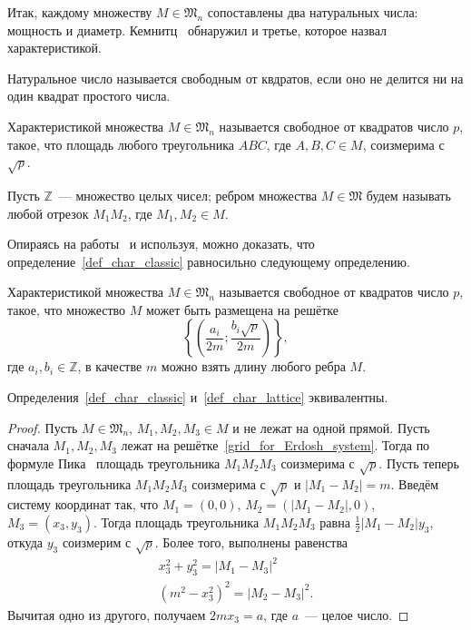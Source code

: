 Итак, каждому множеству $M\in\mathfrak{M}_n$ сопоставлены
два натуральных числа: мощность и диаметр.
Кемнитц~\cite{kemnitz1988punktmengen} обнаружил и третье,
которое назвал характеристикой.

\begin{definition}
	\cite[гл. 34, п. 3]{Bukhstab-number-theory}
	Натуральное число называется свободным от квдратов,
	если оно не делится ни на один квадрат простого числа.
\end{definition}

\begin{definition}
	\label{def_char_classic}
	Характеристикой множества $M\in\mathfrak{M}_n$ называется свободное от квадратов
	число $p$, такое, что площадь любого треугольника $ABC$, где $A,B,C\in M$,
	соизмерима с $\sqrt{p}$.
\end{definition}

Пусть $\mathbb{Z}$~--- множество целых чисел;
ребром множества $M\in\mathfrak{M}$
будем называть любой отрезок $M_1 M_2$,
где $M_1, M_2 \in M$.

Опираясь на работы~\cite{our-mkmitu-2016,our-ped-2017} и используя,
можно доказать, что определение~\ref{def_char_classic} равносильно следующему определению.
\begin{definition}
	\label{def_char_lattice}
	Характеристикой множества $M\in\mathfrak{M}_n$ называется свободное от квадратов
	число $p$, такое, что множество $M$ может быть размещена на решётке
\begin{equation}\label{grid_for_Erdosh_system}
	\left\{\left(
		\frac{a_i}{2m}
		;
		\frac{b_i\sqrt{p}}{2m}
	\right)\right\},
\end{equation}
где $a_i, b_i \in \mathbb{Z}$,
в качестве $m$ можно взять длину любого ребра $M$.
\end{definition}

\begin{theorem}
	Определения~\ref{def_char_classic} и~\ref{def_char_lattice} эквивалентны.
\end{theorem}
\begin{proof}
	Пусть $M\in\mathfrak{M}_n$, $M_1,M_2,M_3 \in M$ и не лежат на одной прямой.
	Пусть сначала $M_1,M_2,M_3$ лежат на решётке~\eqref{grid_for_Erdosh_system}.
	Тогда по формуле Пика~\cite[теорема 3.1]{polygons-on-lattices} площадь треугольника $M_1 M_2 M_3$
	соизмерима с $\sqrt{p}$.
	Пусть теперь площадь треугольника $M_1 M_2 M_3$ соизмерима с $\sqrt{p}$ и $|M_1 - M_2|=m$.
	Введём систему координат так, что $M_1 = (0,0)$,
	$M_2 = (|M_1 - M_2|, 0)$,
	$M_3 = (x_3, y_3)$.
	Тогда площадь треугольника $M_1 M_2 M_3$ равна $\frac{1}{2} |M_1 - M_2| y_3$,
	откуда $y_3$ соизмерим с $\sqrt{p}$.
	Более того, выполнены равенства
	\begin{gather*}
		x_3^2 + y_3^2 = |M_1 - M_3|^2
		\\
		(m^2 - x_3^2)^2 = |M_2 - M_3|^2
		.
	\end{gather*}
	Вычитая одно из другого, получаем $2mx_3 = a$, где $a$~--- целое число.
\end{proof}

